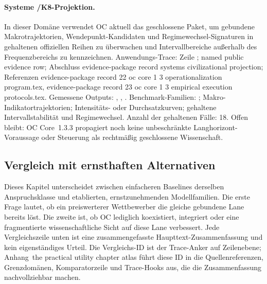 \paragraph{Systeme /\allowbreak K8-Projektion.}
In dieser Domäne verwendet OC aktuell das geschlossene Paket, um gebundene Makrotrajektorien, Wendepunkt-Kandidaten und Regimewechsel-Signaturen in gehaltenen offiziellen Reihen zu überwachen und Intervallbereiche außerhalb des Frequenzbereichs zu kennzeichnen.
Anwendungs-Trace: Zeile ; named public evidence row; \allowbreak Abschluss evidence-package record systems civilizational projection; \allowbreak Referenzen evidence-package record 22 oc core 1 3 operationalization program.tex, \allowbreak evidence-package record 23 oc core 1 3 empirical execution protocols.tex.
Gemessene Outputs: , , .
Benchmark-Familien: ; Makro-Indikatortrajektorien; Intensitäts- oder Durchsatzkurven; gehaltene Intervallstabilität und Regimewechsel.
Anzahl der gehaltenen Fälle: 18.
Offen bleibt: OC Core~1.3.3 propagiert noch keine unbeschränkte Langhorizont-Voraussage oder Steuerung als rechtmäßig geschlossene Wissenschaft.

\subsection{Vergleich mit ernsthaften Alternativen}
Dieses Kapitel unterscheidet zwischen einfacheren Baselines derselben Anspruchsklasse und etablierten, ernstzunehmenden Modellfamilien. Die erste Frage lautet, ob ein preiswerterer Wettbewerber die gleiche gebundene Lane bereits löst. Die zweite ist, ob OC lediglich koexistiert, integriert oder eine fragmentierte wissenschaftliche Sicht auf diese Lane verbessert.
Jede Vergleichszeile unten ist eine zusammengefasste Haupttext-Zusammenfassung und kein eigenständiges Urteil. Die Vergleichs-ID ist der Trace-Anker auf Zeilenebene; Anhang~the practical utility chapter atlas führt diese ID in die Quellenreferenzen, Grenzdomänen, Komparatorzeile und Trace-Hooks aus, die die Zusammenfassung nachvollziehbar machen.

